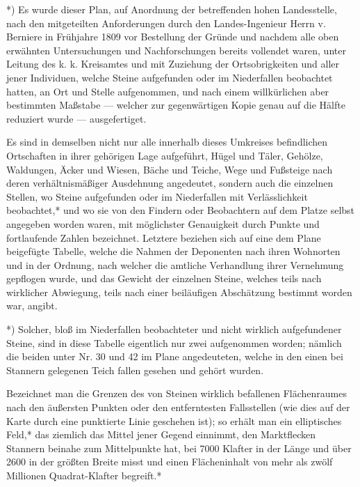 \documentclass[a4paper, 11pt, oneside, german]{article}
\begin{document}
*) Es wurde dieser Plan, auf Anordnung der betreffenden hohen Landesstelle, nach den mitgeteilten Anforderungen durch den Landes-Ingenieur Herrn v. Berniere in Frühjahre 1809 vor Bestellung der Gründe und nachdem alle oben erwähnten Untersuchungen und Nachforschungen bereits vollendet waren, unter Leitung des k. k. Kreisamtes und mit Zuziehung der Ortsobrigkeiten und aller jener Individuen, welche Steine aufgefunden oder im Niederfallen beobachtet hatten, an Ort und Stelle aufgenommen, und nach einem willkürlichen aber bestimmten Maßstabe --- welcher zur gegenwärtigen Kopie genau auf die Hälfte reduziert wurde --- ausgefertiget.

Es sind in demselben nicht nur alle innerhalb dieses Umkreises befindlichen Ortschaften in ihrer gehörigen Lage aufgeführt, Hügel und Täler, Gehölze, Waldungen, Äcker und Wiesen, Bäche und Teiche, Wege und Fußsteige nach deren verhältnismäßiger Ausdehnung angedeutet, sondern auch die einzelnen Stellen, wo Steine aufgefunden oder im Niederfallen mit Verlässlichkeit beobachtet,* und wo sie von den Findern oder Beobachtern auf dem Platze selbst angegeben worden waren, mit möglichster Genauigkeit durch Punkte und fortlaufende Zahlen bezeichnet. Letztere beziehen sich auf eine dem Plane beigefügte Tabelle, welche die Nahmen der Deponenten nach ihren Wohnorten und in der Ordnung, nach welcher die amtliche Verhandlung ihrer Vernehmung gepflogen wurde, und das Gewicht der einzelnen Steine, welches teils nach wirklicher Abwiegung, teils nach einer beiläufigen Abschätzung bestimmt worden war, angibt.

*) Solcher, bloß im Niederfallen beobachteter und nicht wirklich aufgefundener Steine, sind in diese Tabelle eigentlich nur zwei aufgenommen worden; nämlich die beiden unter Nr. 30 und 42 im Plane angedeuteten, welche in den einen bei Stannern gelegenen Teich fallen gesehen und gehört wurden.

Bezeichnet man die Grenzen des von Steinen wirklich befallenen Flächenraumes nach den äußersten Punkten oder den entferntesten Fallsstellen (wie dies auf der Karte durch eine punktierte Linie geschehen ist); so erhält man ein elliptisches Feld,* das ziemlich das Mittel jener Gegend einnimmt, den Marktflecken Stannern beinahe zum Mittelpunkte hat, bei 7000 Klafter in der Länge und über 2600 in der größten Breite misst und einen Flächeninhalt von mehr als zwölf Millionen Quadrat-Klafter begreift.*
\end{document}
